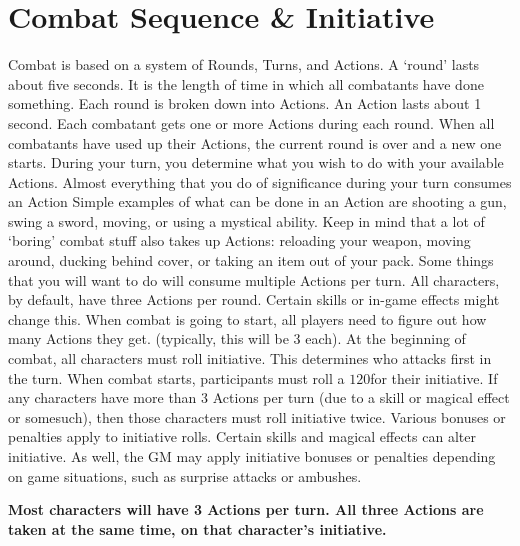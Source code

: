 \documentclass[twoside]{book}
\begin{document}
\section{Combat Sequence \& Initiative}
     Combat is based on a system of Rounds, Turns, and
             Actions. A `round' lasts about five seconds. It
             is the length of time in which all combatants have done
             something. Each round is broken down into Actions. An Action
             lasts about 1 second. Each combatant gets one or more
             Actions during each round. When all combatants have used up
             their Actions, the current round is over and a new one
             starts.  During your turn, you determine what you wish to do
             with your available Actions. Almost everything that you do
             of significance during your turn consumes an Action Simple
             examples of what can be done in an Action are shooting a
             gun, swing a sword, moving, or using a mystical ability.
             Keep in mind that a lot of `boring' combat stuff
             also takes up Actions: reloading your weapon, moving around,
             ducking behind cover, or taking an item out of your pack.
             Some things that you will want to do will consume multiple
             Actions per turn.  All characters, by default, have three Actions per
             round. Certain skills or in-game effects might change this.
             When combat is going to start, all players need to figure
             out how many Actions they get. (typically, this will be 3
             each).  At the beginning of combat, all characters must roll
             initiative. This determines who attacks first in the turn.
             When combat starts, participants must roll a \ensuremath{1}\ensuremath{20}\textscbf{}for their
             initiative. If any characters have more than 3 Actions per
             turn (due to a skill or magical effect or somesuch), then
             those characters must roll initiative twice.  Various bonuses or penalties apply to initiative
             rolls. Certain skills and magical effects can alter
             initiative. As well, the GM may apply initiative bonuses or
             penalties depending on game situations, such as surprise
             attacks or ambushes. 

 \textbf{ Most characters will have 3 Actions per turn. All
             three Actions are taken at the same time, on that
             character's initiative. }
\end{document}
